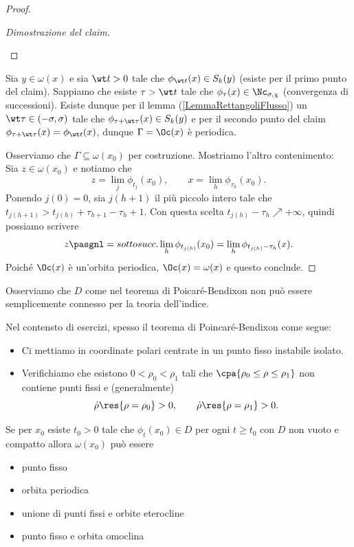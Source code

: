 \begin{proof}
\begin{proof}[Dimostrazione del claim]
\begin{itemize}
\end{itemize}
\setlength{\leftmargini}{0.5cm}
\end{proof}
\noindent
Sia $y\in \omega(x)$ e sia $\wt t>0$ tale che $\phi_{\wt t}(x)\in S_k(y)$ (esiste per il primo punto del claim). Sappiamo che esiste $\tau>\wt t$ tale che $\phi_{\tau}(x)\in \Nc_{\sigma,\chi}$ (convergenza di successioni). Esiste dunque per il lemma (\ref{LemmaRettangoliFlusso}) un $\wt \tau\in (-\sigma,\sigma)$ tale che $\phi_{\tau+\wt \tau}(x)\in S_k(y)$ e per il secondo punto del claim $\phi_{\tau+\wt\tau}(x)=\phi_{\wt t}(x)$, dunque $\Gamma=\Oc(x)$ \`e periodica.
\vspace{0.25cm}

\noindent
Osserviamo che $\Gamma\subseteq \omega(x_0)$ per costruzione. Mostriamo l'altro contenimento:\\
Sia $z\in \omega(x_0)$ e notiamo che 
\[z=\lim_j \phi_{t_j}(x_0),\qquad x=\lim_{h}\phi_{\tau_h}(x_0).\] 
Ponendo $j(0)=0$, sia $j(h+1)$ il pi\`u piccolo intero tale che $t_{j(h+1)}>t_{j(h)}+\tau_{h+1}-\tau_{h}+1$. Con questa scelta $t_{j(h)}-\tau_h\nearrow +\infty$, quindi possiamo scrivere 
\[z\pasgnl={sottosucc.}\lim_h \phi_{t_{j(h)}}(x_0)=\lim_h\phi_{t_{j(h)}-\tau_h}(x).\]
Poich\'e $\Oc(x)$ \`e un'orbita periodica, $\Oc(x)=\omega(x)$ e questo conclude.
\end{proof}

\begin{remark}
Osserviamo che $D$ come nel teorema di Poicar\'e-Bendixon non pu\`o essere semplicemente connesso per la teoria dell'indice.
\end{remark}

\begin{remark}
Nel contensto di esercizi, spesso il teorema di Poincar\'e-Bendixon come segue:
\begin{itemize}
\item Ci mettiamo in coordinate polari centrate in un punto fisso instabile isolato.
\item Verifichiamo che esistono $0<\rho_0<\rho_1$ tali che $\cpa{\rho_0\leq\rho\leq \rho_1}$ non contiene punti fissi e (generalmente) 
\[\dot\rho\res{\rho=\rho_0}>0,\qquad\dot \rho\res{\rho=\rho_1}>0.\]
\end{itemize}
\end{remark}

\begin{fact}
Se per $x_0$ esiste $t_0>0$ tale che $\phi_t(x_0)\in D$ per ogni $t\geq t_0$ con $D$ non vuoto e compatto allora $\omega(x_0)$ pu\`o essere
\begin{itemize}
\item punto fisso
\item orbita periodica
\item unione di punti fissi e orbite eterocline
\item punto fisso e orbita omoclina
\end{itemize}
\end{fact}

